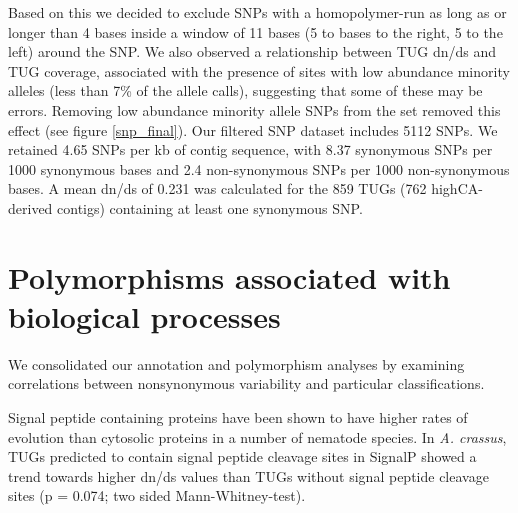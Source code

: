 
Based on this we decided to exclude SNPs with a homopolymer-run as
long as or longer than 4 bases inside a window of 11 bases (5 to bases
to the right, 5 to the left) around the SNP. We also observed a
relationship between TUG dn/ds and TUG coverage, associated with the
presence of sites with low abundance minority alleles (less than 7\%
of the allele calls), suggesting that some of these may be errors.
Removing low abundance minority allele SNPs from the set removed this
effect (see figure \ref{snp_final}).  Our filtered SNP dataset
includes 5112 SNPs. We retained 4.65 SNPs per kb of contig sequence,
with 8.37 synonymous SNPs per 1000 synonymous bases and 2.4
non-synonymous SNPs per 1000 non-synonymous bases. A mean dn/ds of
0.231 was calculated for the 859 TUGs (762 highCA-derived contigs)
containing at least one synonymous SNP.


\section{Polymorphisms associated with biological processes}

We consolidated our annotation and polymorphism analyses by examining
correlations between nonsynonymous variability and particular
classifications.

Signal peptide containing proteins have been shown to have higher
rates of evolution than cytosolic proteins in a number of nematode
species. In \textit{A. crassus}, TUGs predicted to contain signal
peptide cleavage sites in SignalP showed a trend towards higher dn/ds
values than TUGs without signal peptide cleavage sites (p = 0.074; two
sided Mann-Whitney-test).

